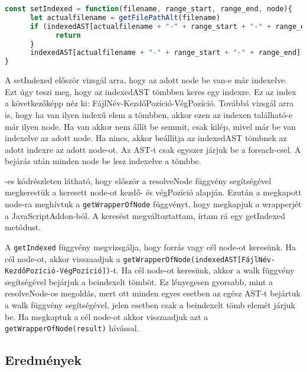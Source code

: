 \begin{lstlisting}[caption={setIndexed metódus}, label={lst:setIndexed_function}, language={JavaScript}]
const setIndexed = function(filename, range_start, range_end, node){
      let actualfilename = getFilePathAlt(filename)
      if (indexedAST[actualfilename + "-" + range_start + "-" + range_end] !== undefined && indexedAST[actualfilename + "-" + range_start + "-" + range_end] !== node){
            return
      }
      indexedAST[actualfilename + "-" + range_start + "-" + range_end] = node
}
\end{lstlisting}

A setIndexed először vizsgál arra, hogy az adott node be van-e már indexelve.
Ezt úgy teszi meg, hogy az indexedAST tömbben keres egy indexre.
Ez az index a következőképp néz ki: FájlNév-KezdőPozíció-VégPozíció.
Továbbá vizsgál arra is, hogy ha van ilyen indexű elem a tömbben, akkor ezen az indexen található-e már ilyen node.
Ha van akkor nem állít be semmit, csak kilép, mivel már be van indexelve az adott node. Ha nincs, akkor beállítja az indexedAST tömbnek az adott indexre az adott node-ot.
Az AST-t csak egyszer járjuk be a foreach-csel. A bejárás után minden node be lesz indexelve a tömbbe.


-es kódrészleten látható, hogy először a resolveNode függvény segítségével megkerestük a keresett node-ot kezdő- és végPozíció alapján.
Ezután a megkapott node-ra meghívtuk a \texttt{getWrapperOfNode} függvényt, hogy megkapjuk a wrapperjét a JavaScriptAddon-ból.
A keresést megváltoztattam, írtam rá egy getIndexed metódust.


A \texttt{getIndexed} függvény megvizsgálja, hogy forrás vagy cél node-ot keresünk.
Ha cél node-ot, akkor visszaadjuk a \texttt{getWrapperOfNode(indexedAST[FájlNév-KezdőPozíció-VégPozíció])}-t.
Ha cél node-ot keresünk, akkor a walk függvény segítségével bejárjuk a beindexelt tömböt.
Ez lényegesen gyorsabb, mint a resolveNode-os megoldás, mert ott minden egyes esetben az egész AST-t bejártuk a walk függvény segítségével, jelen esetben csak a beindexelt tömb elemét járjuk be.
Ha megkaptuk a cél node-ot akkor visszaadjuk azt a \texttt{getWrapperOfNode(result)} hívással.

\subsection{Eredmények}


